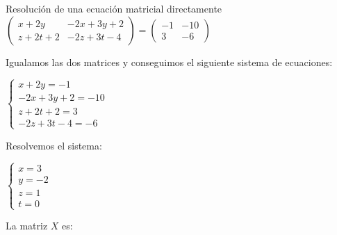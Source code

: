 \documentclass[9pt]{beamer}
\begin{document}
\begin{frame}{Resolución de una ecuación matricial directamente}
\pause
$\begin{pmatrix} x+2y & -2x+3y+2 \\ z+2t+2 & -2z+3t-4 \end{pmatrix} = \begin{pmatrix} -1 & -10 \\ 3 & -6 \end{pmatrix}$

\pause
Igualamos las dos matrices y conseguimos el siguiente sistema de ecuaciones:

$\begin{cases} x+2y = -1 \\ -2x+3y+2=-10  \\ z+2t+2= 3 \\ -2z+3t-4=-6 \end{cases}$

\pause
Resolvemos el sistema:

$\begin{cases} x= 3 \\ y = -2 \\ z=1 \\ t =0 \end{cases}$

\pause
La matriz $X$ es: 


\end{frame}
\end{document}
